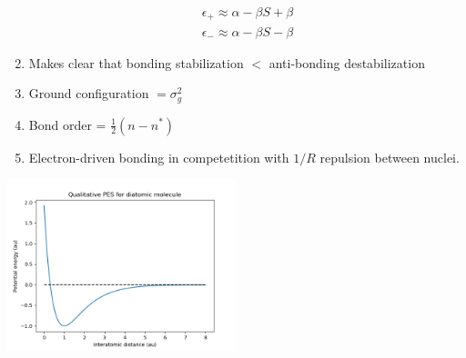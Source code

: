 \documentclass[11pt]{article}
\begin{document}
\begin{enumerate}
\begin{eqnarray*}
	\epsilon_+\approx \alpha-\beta S + \beta \\
	\epsilon_-\approx \alpha - \beta S - \beta
\end{eqnarray*}
\item Makes clear that bonding stabilization \(<\) anti-bonding destabilization
\item Ground configuration \(=\sigma_g^2\)
\item Bond order = \(\frac{1}{2}(n-n^*)\)
\item Electron-driven bonding in competetition with \(1/R\) repulsion between nuclei.
\end{enumerate}

\begin{center}
\includegraphics[width=0.5\textwidth]{./Images/Morse.png}
\end{center}
\end{document}
